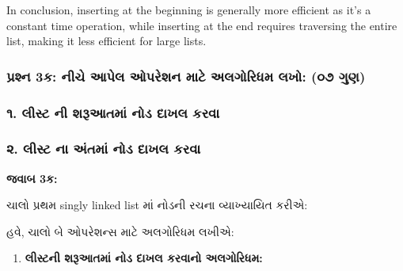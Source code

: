 In conclusion, inserting at the beginning is generally more efficient as
it's a constant time operation, while inserting at the end requires
traversing the entire list, making it less efficient for large lists.

\hypertarget{uxaaauxab0uxab6uxaa8-3uxa95-uxaa8uxa9a-uxa86uxaaauxab2-uxa93uxaaauxab0uxab6uxaa8-uxaaeuxa9f-uxa85uxab2uxa97uxab0uxaa7uxaae-uxab2uxa96-uxae6uxaed-uxa97uxaa3}{%
\subsubsection{પ્રશ્ન 3ક: નીચે આપેલ ઓપરેશન માટે અલગોરિધમ લખો: (૦૭
ગુણ)}\label{uxaaauxab0uxab6uxaa8-3uxa95-uxaa8uxa9a-uxa86uxaaauxab2-uxa93uxaaauxab0uxab6uxaa8-uxaaeuxa9f-uxa85uxab2uxa97uxab0uxaa7uxaae-uxab2uxa96-uxae6uxaed-uxa97uxaa3}}

\hypertarget{uxab2uxab8uxa9f-uxaa8-uxab6uxab0uxa86uxaa4uxaae-uxaa8uxaa1-uxaa6uxa96uxab2-uxa95uxab0uxab5}{%
\subsubsection{૧. લીસ્ટ ની શરૂઆતમાં નોડ દાખલ
કરવા}\label{uxab2uxab8uxa9f-uxaa8-uxab6uxab0uxa86uxaa4uxaae-uxaa8uxaa1-uxaa6uxa96uxab2-uxa95uxab0uxab5}}

\hypertarget{uxab2uxab8uxa9f-uxaa8-uxa85uxaa4uxaae-uxaa8uxaa1-uxaa6uxa96uxab2-uxa95uxab0uxab5}{%
\subsubsection{૨. લીસ્ટ ના અંતમાં નોડ દાખલ
કરવા}\label{uxab2uxab8uxa9f-uxaa8-uxa85uxaa4uxaae-uxaa8uxaa1-uxaa6uxa96uxab2-uxa95uxab0uxab5}}

\textbf{જવાબ 3ક:}

ચાલો પ્રથમ singly linked list માં નોડની રચના વ્યાખ્યાયિત કરીએ:

\begin{Shaded}
\begin{Highlighting}[]
     \NormalTok{(}
        \OperatorTok{=}
         \OperatorTok{=} 
\end{Highlighting}
\end{Shaded}

હવે, ચાલો બે ઓપરેશન્સ માટે અલગોરિધમ લખીએ:

\begin{enumerate}
\def\labelenumi{\arabic{enumi}.}
\tightlist
\item
  \textbf{લીસ્ટની શરૂઆતમાં નોડ દાખલ કરવાનો અલગોરિધમ:}
\end{enumerate}

